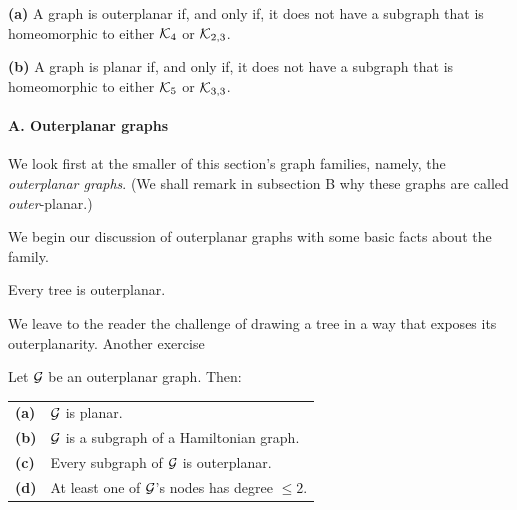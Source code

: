 \begin{theorem}
\label{thm:planar+outerplanar-exclusion}
{\bf (a)} {\rm \cite{ChartrandB67}}
A graph is outerplanar if, and only if, it does not have a subgraph
that is homeomorphic to either $\mbox{$\cal K$}_4$ or $\mbox{$\cal K$}_{2,3}$.

{\bf (b)} {\rm \cite{Kuratowski30}}
A graph is planar if, and only if, it does not have a subgraph
that is homeomorphic to either $\mbox{$\cal K$}_5$ or $\mbox{$\cal K$}_{3,3}$.
\end{theorem}


\paragraph{\small\sf A. Outerplanar graphs}

We look first at the smaller of this section's graph families, namely,
the {\it outerplanar graphs}. 
 (We shall remark in subsection B why these
graphs are called {\em outer}-planar.)

We begin our discussion of outerplanar graphs with some basic facts
about the family.

\begin{prop}
Every tree is outerplanar.
\end{prop}

We leave to the reader the challenge of drawing a tree in a way that
exposes its outerplanarity.  {\Arny Another exercise}

\begin{prop}
\label{thm:basic-outerplanar-stuff}
Let $\mbox{$\cal G$}$ be an outerplanar graph.  Then:

\begin{tabular}{ll}
{\bf (a)} &
$\mbox{$\cal G$}$ is planar. \\
{\bf (b)} &
$\mbox{$\cal G$}$ is a subgraph of a Hamiltonian graph. \\
{\bf (c)} &
Every subgraph of $\mbox{$\cal G$}$ is outerplanar. \\
{\bf (d)} &
At least one of $\mbox{$\cal G$}$'s nodes has degree $\leq 2$.
\end{tabular}
\end{prop}


